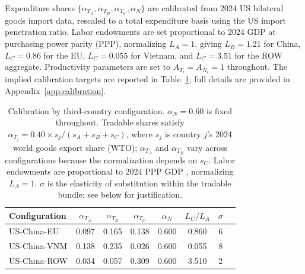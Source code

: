 \documentclass[11pt]{article}
\theoremstyle{plain}
\theoremstyle{remark}
\numberwithin{lemma}{section}
\numberwithin{proposition}{section}
\numberwithin{corollary}{section}
\newcommand{\rev}[1]{{\color{RevBlue}#1}}
\begin{document}
Expenditure shares $\{\alpha_{T_A}, \alpha_{T_B}, \alpha_{T_C}, \alpha_N\}$ are calibrated from 2024 US bilateral goods import data, rescaled to a total expenditure basis using the US import penetration ratio. Labor endowments are set proportional to 2024 GDP at purchasing power parity (PPP), normalizing $L_A = 1$, giving $L_B = 1.21$ for China, $L_C = 0.86$ for the EU, $L_C = 0.055$ for Vietnam, and $L_C = 3.51$ for the ROW aggregate. Productivity parameters are set to $A_{T_i} = A_{N_i} = 1$ throughout. The implied calibration targets are reported in Table~\ref{tab:calibration}; full details are provided in Appendix~\ref{app:calibration}.

\begin{table}[htbp]
\centering
\begin{tabular}{lccccccc}
\hline
Configuration & $\alpha_{T_A}$ & $\alpha_{T_B}$ & $\alpha_{T_C}$ & $\alpha_N$ & $L_C / L_A$ & $\sigma$ \\
\hline
US-China-EU  & 0.097 & 0.165 & 0.138 & 0.600 & 0.860  & 6 \\
US-China-VNM & 0.138 & \rev{0.235} & 0.026 & 0.600 & 0.055  & 8 \\
US-China-ROW & 0.034 & 0.057 & 0.309 & 0.600 & 3.510  & 2 \\
\hline
\end{tabular}
\caption{Calibration by third-country configuration. $\alpha_N = 0.60$ is fixed throughout. Tradable shares satisfy $\alpha_{T_j} = 0.40 \times s_j / (s_A + s_B + s_C)$, where $s_j$ is country $j$'s 2024 world goods export share (WTO); $\alpha_{T_A}$ and $\alpha_{T_B}$ vary across configurations because the normalization depends on $s_C$. Labor endowments are proportional to 2024 PPP GDP \citep{imf2024weo}, normalizing $L_A = 1$. $\sigma$ is the elasticity of substitution within the tradable bundle; see below for justification.}
\label{tab:calibration}
\end{table}
\end{document}
